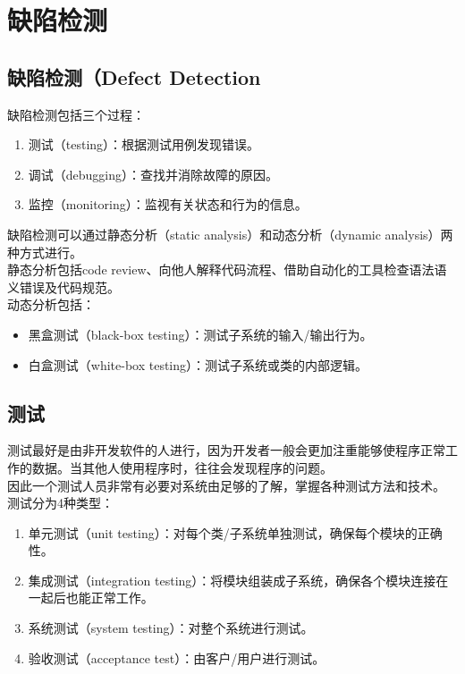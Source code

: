 \newpage

\section{缺陷检测}

\subsection{缺陷检测（Defect Detection}

缺陷检测包括三个过程：

\begin{enumerate}
    \item 测试（testing）：根据测试用例发现错误。
    \item 调试（debugging）：查找并消除故障的原因。
    \item 监控（monitoring）：监视有关状态和行为的信息。
\end{enumerate}

缺陷检测可以通过静态分析（static analysis）和动态分析（dynamic analysis）两种方式进行。\\

静态分析包括code review、向他人解释代码流程、借助自动化的工具检查语法语义错误及代码规范。\\

动态分析包括：

\begin{itemize}
    \item 黑盒测试（black-box testing）：测试子系统的输入/输出行为。
    \item 白盒测试（white-box testing）：测试子系统或类的内部逻辑。
\end{itemize}

\vspace{0.5cm}

\subsection{测试}

测试最好是由非开发软件的人进行，因为开发者一般会更加注重能够使程序正常工作的数据。当其他人使用程序时，往往会发现程序的问题。\\

因此一个测试人员非常有必要对系统由足够的了解，掌握各种测试方法和技术。\\

测试分为4种类型：

\begin{enumerate}
    \item 单元测试（unit testing）：对每个类/子系统单独测试，确保每个模块的正确性。

    \item 集成测试（integration testing）：将模块组装成子系统，确保各个模块连接在一起后也能正常工作。

    \item 系统测试（system testing）：对整个系统进行测试。

    \item 验收测试（acceptance test）：由客户/用户进行测试。
\end{enumerate}